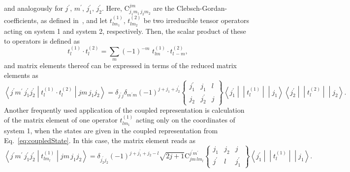 and analogously for $j^\prime,\, m^\prime,\,j_1^\prime,\,j_2^\prime$. Here, $\text{C}^{jm}_{j_1m_1\,j_2m_2}$ are the Clebsch-Gordan-coefficients, as defined in~\cite[Section 9.]{varshalovich1988}, and let $t^{(1)}_{l m_1}$, $t^{(2)}_{l m_2}$ be two irreducible tensor operators acting on system 1 and system 2, respectively. Then, the scalar product of these to operators is defined as
\begin{equation}
\label{app:tensor_scalarProd}
t^{(1)}_{l}\cdot t^{(2)}_{l} = \sum_{m}(-1)^{-m}\,\, t^{(1)}_{lm}\cdot t^{(2)}_{l\,-m},
\end{equation}
and matrix elements thereof can be expressed in terms of the reduced matrix elements as~\cite{varshalovich1988}
\begin{equation}
\label{app:reducedMatEl_expectation}
\left< j^\prime m ^\prime\,j_1^\prime j_2^\prime \middle| t^{(1)}_{l}\cdot t^{(2)}_{l} \middle| j m \,j_1 j_2\right>
=
\delta_{j^\prime j}\delta_{m^\prime m}(-1)^{j+j_1+j_2^\prime}
\begin{Bmatrix}
j_1^\prime&j_1&l\\
j_2&j_2^\prime&j
\end{Bmatrix}
\left< j_1^\prime\middle|\middle| t^{(1)}_{l}\middle|\middle|j_1\right>
\left< j_2^\prime\middle|\middle| t^{(2)}_{l}\middle|\middle|j_2\right>.
\end{equation}
Another frequently used application of the coupled representation is calculation of the matrix element of one operator $t^{(1)}_{l m_1}$ acting only on the coordinates of system 1, when the states are given in the coupled representation from Eq.~\eqref{eq:coupledState}. In this case, the matrix element reads as~\cite{varshalovich1988}
\begin{equation}
\label{app:subsystem_expectation}
\left< j^\prime m ^\prime\,j_1^\prime j_2^\prime \middle| t^{(1)}_{lm_l} \middle| j m \,j_1 j_2\right>
=
\delta_{j_2^\prime j_2}(-1)^{j+j_1^\prime+j_2-l}
\sqrt{2j+1}
\text{C}^{j^\prime m^\prime}_{j m\,lm_l}
\begin{Bmatrix}
j_1&j_2&j\\
j^\prime&l&j_1^\prime
\end{Bmatrix}
\left< j_1^\prime\middle|\middle| t^{(1)}_{l}\middle|\middle|j_1\right>.
\end{equation}
